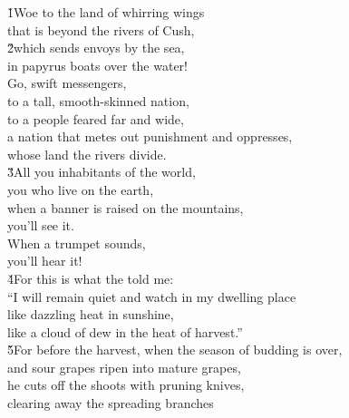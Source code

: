 \begin{poetry}
\poeml {}
\v{1}Woe to the land of whirring wings \\
\poemll    that is beyond the rivers of Cush, \\
\poeml \v{2}which sends envoys by the sea, \\
\poemll    in papyrus boats over the water! \\
\poeml Go, swift messengers, \\
\poemll    to a tall, smooth-skinned nation, \\
\poeml to a people feared far and wide, \\
\poemll    a nation that metes out punishment and oppresses, \\
\poemlll       whose land the rivers divide. \\
\poeml \v{3}All you inhabitants of the world, \\
\poemll    you who live on the earth, \\
\poeml when a banner is raised on the mountains, \\
\poemll    you'll see it. \\
\poeml When a trumpet sounds, \\
\poemll    you'll hear it! \\
\poeml \v{4}For this is what the  told me: \\
\poeml ``I will remain quiet and watch in my dwelling place \\
\poemll    like dazzling heat in sunshine, \\
\poemlll       like a cloud of dew in the heat of harvest.'' \\
\poeml \v{5}For before the harvest, when the season of budding is over, \\
\poemll    and sour grapes ripen into mature grapes, \\
\poeml he cuts off the shoots with pruning knives, \\
\poemll    clearing away the spreading branches \\

\end{poetry}
